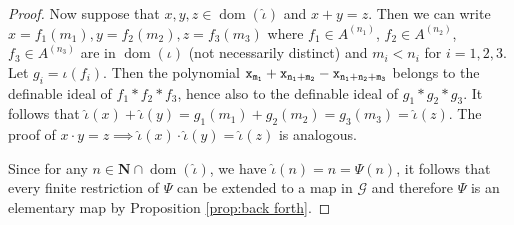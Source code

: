 \documentclass[10pt,a4paper]{amsart}
\newcommand{\ca}{\mathcal}
\newcommand{\dom}{\operatorname{dom}}
\newcommand{\hn}{\mathbf N}
\begin{document}
\begin{proof}
Now suppose that $x,y,z\in \dom(\hat \iota)$ and $x+y= z$. Then we can write $x = f_1(m_1), y=f_2(m_2), z= f_3(m_3)$ where $f_1 \in A^{(n_1)}$, $f_2\in A^{(n_2)}$, $f_3 \in A^{(n_3)}$ are in $ \dom(\iota)$ (not necessarily distinct) and $m_i<n_i$ for $i=1,2,3$. Let $g_i = \iota(f_i)$. Then the polynomial $\tt x_{m_1} + \tt x_{n_1+m_2} - \tt x_{n_1+n_2+m_3}$ belongs to the definable ideal of $f_1*f_2*f_3$, hence also to the definable ideal of $g_1*g_2*g_3$. It follows that $\hat \iota (x) + \hat \iota(y) = g_1(m_1) + g_2(m_2) = g_3(m_3) =  \hat \iota (z)$. 
The proof of $x\cdot y= z \implies \hat \iota(x)\cdot \hat \iota(y) = \hat \iota(z)$ is analogous. 

Since for any $n\in \hn \cap \dom(\hat \iota)$, we have $\hat \iota (n) = n = \Psi(n)$, it follows that every finite restriction of $\Psi$ can be extended to a map in $\ca G$ and therefore $\Psi$ is an elementary map by Proposition \ref{prop:back forth}. 
\end{proof}
\end{document}
